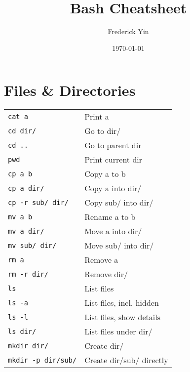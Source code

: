 \documentclass[a4paper, twocolumn]{article}
\title{Bash Cheatsheet}
\author{Frederick Yin}
\date{\today}
\renewcommand{\tt}{\texttt}
\begin{document}
\maketitle
\section{Files \& Directories}
\begin{tabular}{ll}
    \tt{cat a}              & Print a                               \\
    \tt{cd dir/}            & Go to dir/                            \\
    \tt{cd ..}              & Go to parent dir                      \\
    \tt{pwd}                & Print current dir                     \\
    \tt{cp a b}             & Copy a to b                           \\
    \tt{cp a dir/}          & Copy a into dir/                      \\
    \tt{cp -r sub/ dir/}    & Copy sub/ into dir/                   \\
    \tt{mv a b}             & Rename a to b                         \\
    \tt{mv a dir/}          & Move a into dir/                      \\
    \tt{mv sub/ dir/}       & Move sub/ into dir/                   \\
    \tt{rm a}               & Remove a                              \\
    \tt{rm -r dir/}         & Remove dir/                           \\
    \tt{ls}                 & List files                            \\
    \tt{ls -a}              & List files, incl. hidden              \\
    \tt{ls -l}              & List files, show details              \\
    \tt{ls dir/}            & List files under dir/                 \\
    \tt{mkdir dir/}         & Create dir/                           \\
    \tt{mkdir -p dir/sub/}  & Create dir/sub/ directly
\end{tabular}
\end{document}

